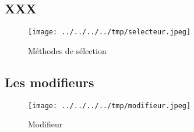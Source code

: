 \subsection{XXX}

\begin{figure}
  \centering
  \texttt{[image: ../../../../tmp/selecteur.jpeg]}
  \caption{Méthodes de sélection}
  \label{fig:methode_selecteur}
\end{figure}





\subsection{Les modifieurs}



\begin{figure}
  \centering
  \texttt{[image: ../../../../tmp/modifieur.jpeg]}
  \caption{Modifieur}
  \label{fig:methode_modifieur}
\end{figure}



